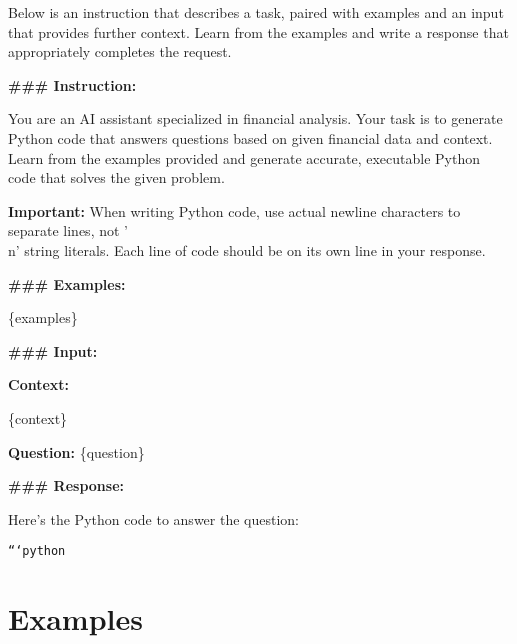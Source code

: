 \documentclass[logo,msc]{infthesis}           %
\begin{document}
\label{sec:Prompt template-code-gen}
\begin{tcolorbox}[
    colback=blue!5!white, %
    colframe=white!75!black, %
    width=\textwidth, %
    boxrule=0.5mm, %
    sharp corners, %
    title=IMPROVED FEW SHOT PROMPT TEMPLATE FOR CODE GENERATION AND EXECUTION,
    fonttitle=\bfseries,
    coltitle=black,
    toptitle=3mm, %
    bottomtitle=3mm %
    ]

Below is an instruction that describes a task, paired with examples and an input that provides further context. Learn from the examples and write a response that appropriately completes the request.

\textbf{### Instruction:}

You are an AI assistant specialized in financial analysis. Your task is to generate Python code that answers questions based on given financial data and context. Learn from the examples provided and generate accurate, executable Python code that solves the given problem.

\textbf{Important:} When writing Python code, use actual newline characters to separate lines, not '\\n' string literals. Each line of code should be on its own line in your response.

\textbf{### Examples:}

\{examples\}

\textbf{### Input:}

\textbf{Context:}

\{context\}

\textbf{Question:} \{question\}

\textbf{### Response:}

Here's the Python code to answer the question:

\texttt{```python}
\end{tcolorbox}

\section{Examples}

\end{document}
